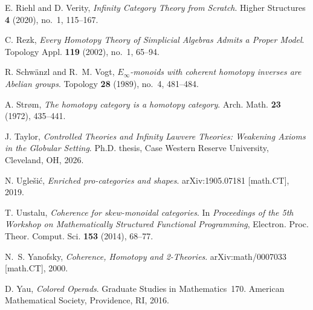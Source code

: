 \documentclass{tac}
\begin{document}
\begin{references*}
E. Riehl and D. Verity,
\emph{Infinity Category Theory from Scratch}.
Higher Structures \textbf{4} (2020), no.~1, 115--167.

C. Rezk,
\emph{Every Homotopy Theory of Simplicial Algebras Admits a Proper Model}.
Topology Appl. \textbf{119} (2002), no.~1, 65--94.

R. Schw\"anzl and R.~M. Vogt,
\emph{$E_\infty$-monoids with coherent homotopy inverses are Abelian groups}.
Topology \textbf{28} (1989), no.~4, 481--484.

A. Str{\o}m,
\emph{The homotopy category is a homotopy category}.
Arch. Math. \textbf{23} (1972), 435--441.

J. Taylor,
\emph{Controlled Theories and Infinity Lawvere Theories: Weakening Axioms in the Globular Setting}.
Ph.D. thesis, Case Western Reserve University, Cleveland, OH, 2026.

N. Ugle\v{s}i\'c,
\emph{Enriched pro-categories and shapes}.
arXiv:1905.07181 [math.CT], 2019.

T. Uustalu,
\emph{Coherence for skew-monoidal categories}.
In \emph{Proceedings of the 5th Workshop on Mathematically Structured Functional Programming},
Electron. Proc. Theor. Comput. Sci. \textbf{153} (2014), 68--77.

N.~S. Yanofsky,
\emph{Coherence, Homotopy and 2-Theories}.
arXiv:math/0007033 [math.CT], 2000.

D. Yau,
\emph{Colored Operads}.
Graduate Studies in Mathematics~170.
American Mathematical Society, Providence, RI, 2016.
\end{references*}
\end{document}
